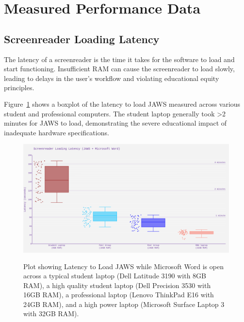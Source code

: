 \hypertarget{measured-performance-data}{}\section{Measured Performance Data}\label{measured-performance-data}

\subsection{Screenreader Loading Latency}\label{screenreader-loading-latency}

The latency of a screenreader is the time it takes for the software to load and start functioning. Insufficient RAM can cause the screenreader to load slowly, leading to delays in the user's workflow and violating educational equity principles.

Figure~\ref{fig:figure1} shows a boxplot of the latency to load JAWS measured across various student and professional computers. The student laptop generally took >2 minutes for JAWS to load, demonstrating the severe educational impact of inadequate hardware specifications.

\begin{figure}[htbp]

	\includegraphics[alt={Screen reader load times by RAM configuration showing: 8GB RAM averaging 143 seconds, 16GB RAM averaging 64 seconds, 24GB RAM averaging 49 seconds, and 32GB RAM averaging 25 seconds. The plot demonstrates significantly improved performance with higher RAM configurations.}]{images/ComputerRBDisplaySpecsTVIFig1.png}
	\caption[Latency to Load JAWS]{Plot showing Latency to Load JAWS while Microsoft Word is open across a typical student laptop (Dell Latitude 3190 with 8GB RAM), a high quality student laptop (Dell Precision 3530 with 16GB RAM), a professional laptop (Lenovo ThinkPad E16 with 24GB RAM), and a high power laptop (Microsoft Surface Laptop 3 with 32GB RAM).}\label{fig:figure1}
	\tagstructend
\end{figure}

